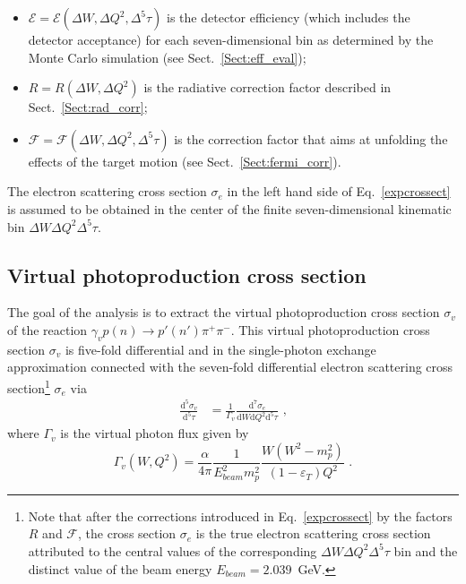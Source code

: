 \begin{itemize}
\item $\mathcal{E} = \mathcal{E}(\Delta W, \Delta Q^{2}, \Delta^{5}\tau)$ is the detector efficiency (which includes the detector acceptance) for each seven-dimensional bin as determined by the Monte Carlo simulation (see Sect.~\ref{Sect:eff_eval}); \vspace{-0.25em}

\item $R = R(\Delta W, \Delta Q^{2})$ is the radiative correction factor described in Sect.~\ref{Sect:rad_corr}; \vspace{-0.25em}

\item $\mathcal{F} = \mathcal{F}(\Delta W, \Delta Q^{2}, \Delta^{5}\tau)$ is the correction factor that aims at unfolding the effects of the target motion (see Sect.~\ref{Sect:fermi_corr}).

\end{itemize}

The electron scattering cross section $\sigma_{e}$ in the left hand side of Eq.~\eqref{expcrossect} is assumed to be obtained in the center of the finite seven-dimensional kinematic bin $\Delta W \Delta Q^{2} \Delta^{5} \tau$. 


\subsection{Virtual photoproduction cross section}

The goal of the analysis is to extract the virtual photoproduction cross section $\sigma_{v}$ of the reaction $\gamma_{v}p(n) \rightarrow p'(n') \pi^{+} \pi^{-}$. This virtual photoproduction cross section $\sigma_{v}$ is five-fold differential and in the single-photon exchange approximation connected with the seven-fold differential electron scattering cross section\footnote[12]{Note that after the corrections introduced in Eq.~\eqref{expcrossect} by the factors $R$ and $\mathcal{F}$, the cross section $\sigma_{e}$ is the true electron scattering cross section attributed to the central values of the corresponding $\Delta W \Delta Q^{2} \Delta^{5} \tau$ bin and the distinct value of the beam energy $E_{beam} = 2.039$~GeV.} $\sigma_{e}$ via 
\begin{equation}
\begin{aligned}
\frac{\textrm{d}^{5}\sigma_{v}}{\textrm{d}^{5}\tau} &= \frac{1}{\Gamma_{v}}\frac{\textrm{d}^{7}\sigma_{e}}{\textrm{d}W\textrm{d}Q^{2}\textrm{d}^{5}\tau}  \textrm{ ,}
\end{aligned} 
\label{fulldiff}
\end{equation}
where $\Gamma_{v}$ is the virtual photon flux given by
\begin{equation}
\Gamma_{v} (W, Q^2) =
\frac{\alpha}{4\pi}\frac{1}{E_{beam}^{2}m_{p}^{2}}\frac{W(W^{2}-m_{p}^{2})}
{(1-\varepsilon_{T})Q^{2}} \textrm{ .}
\label{flux}
\end{equation}

